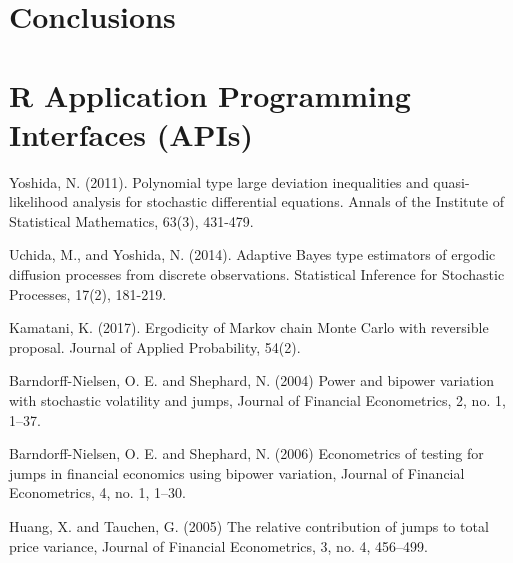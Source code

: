 \section{Conclusions}


\section{R Application Programming Interfaces (APIs)}



\begin{thebibliography}{00}
		
Yoshida, N. (2011). 
\newblock Polynomial type large deviation inequalities and quasi-likelihood analysis for stochastic differential equations. 
\newblock Annals of the Institute of Statistical Mathematics, 63(3), 431-479.

Uchida, M., and Yoshida, N. (2014). 
\newblock Adaptive Bayes type estimators of ergodic diffusion processes from discrete observations. 
\newblock Statistical Inference for Stochastic Processes, 17(2), 181-219.

Kamatani, K. (2017).
\newblock Ergodicity of Markov chain Monte Carlo with reversible proposal. 
\newblock Journal of Applied Probability, 54(2).
	
Barndorff-Nielsen, O. E. and Shephard, N. (2004) 
\newblock Power and bipower variation with stochastic volatility and jumps, 
\newblock Journal of Financial Econometrics, 2, no. 1, 1–37.
	
Barndorff-Nielsen, O. E. and Shephard, N. (2006) 
\newblock Econometrics of testing for jumps in financial economics using bipower variation, 
\newblock Journal of Financial Econometrics, 4, no. 1, 1–30.
	
Huang, X. and Tauchen, G. (2005) 
\newblock The relative contribution of jumps to total price variance, 
\newblock Journal of Financial Econometrics, 3, no. 4, 456–499.
	
\end{thebibliography}

